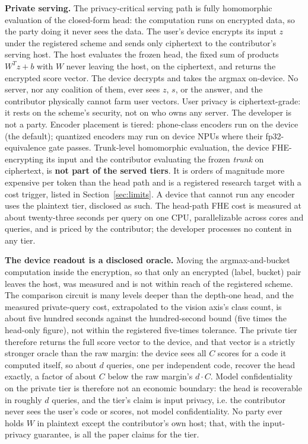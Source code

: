 \documentclass[11pt]{article}
\begin{document}
\textbf{Private serving.} The privacy-critical serving
path is fully homomorphic evaluation of the closed-form head:
the computation runs on encrypted data, so the party doing it
never sees the data. The user's device encrypts its input $z$
under the registered
scheme and sends only ciphertext to the contributor's serving
host. The host evaluates the frozen head, the fixed sum of
products $W^T z + b$ with $W$ never leaving the host, on the
ciphertext, and returns the encrypted score vector. The device
decrypts and takes the argmax on-device. No server, nor any
coalition of them, ever sees $z$, $s$, or the answer, and the
contributor physically cannot farm user vectors. User privacy is
ciphertext-grade: it rests on the scheme's security, not on who
owns any server. The developer is not a party. Encoder placement
is tiered:
phone-class encoders run on the device (the default); quantized
encoders may run on device NPUs where their fp32-equivalence gate
passes. Trunk-level homomorphic evaluation, the device
FHE-encrypting its input and the contributor evaluating the frozen
\emph{trunk} on ciphertext, is \textbf{not part of the served
    tiers}. It is orders of magnitude more expensive per token than
the head path and is a registered research target with a cost
trigger, listed in Section~\ref{sec:limits}. A device that cannot
run any encoder
uses the plaintext tier, disclosed as such. The head-path FHE cost
is measured at about twenty-three seconds per query on one CPU,
parallelizable across cores and queries, and is priced by the
contributor; the developer processes no content in any tier.

\textbf{The device readout is a disclosed oracle.} Moving the
argmax-and-bucket computation inside the encryption, so that
only an encrypted (label, bucket) pair leaves the host, was
measured and is not within reach of the registered scheme. The
comparison circuit is many levels deeper than the depth-one head,
and the measured private-query cost, extrapolated to the vision
axis's class count, is about five hundred seconds against the
hundred-second bound (five times the head-only figure), not
within the registered five-times tolerance. The private tier
therefore returns the full score vector to the device, and that
vector is a strictly stronger oracle than the raw margin: the
device sees all $C$ scores for a code it computed itself, so
about $d$ queries, one per independent code, recover the
head exactly, a factor of about $C$ below the raw margin's
$d \cdot C$. Model confidentiality on the private tier is
therefore not an economic boundary: the head is recoverable in
roughly $d$ queries, and the tier's claim is input privacy, i.e. the
contributor never sees the user's code or scores, not
model confidentiality. No party ever holds $W$ in plaintext
except the contributor's own host; that, with the input-privacy
guarantee, is all the paper claims for the tier.
\end{document}
